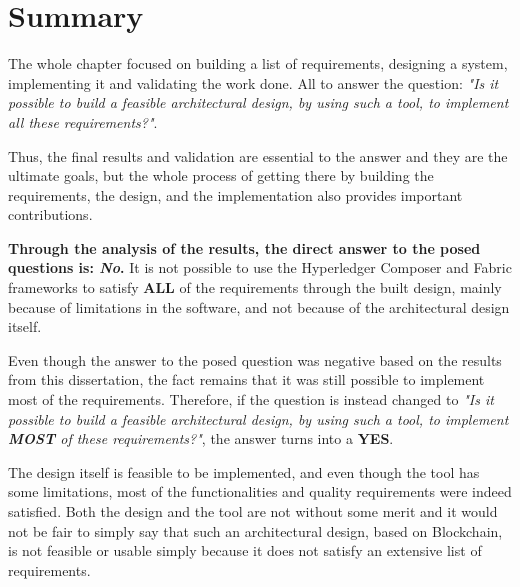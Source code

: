 \section{Summary}

The whole chapter focused on building a list of requirements, designing a system, implementing it and validating the work done. All to answer the question: \textit{"Is it possible to build a feasible architectural design, by using such a tool, to implement all these requirements?"}.

Thus, the final results and validation are essential to the answer and they are the ultimate goals, but the whole process of getting there by building the requirements, the design, and the implementation also provides important contributions.


\textbf{Through the analysis of the results, the direct answer to the posed questions is: \textit{No}.} It is not possible to use the Hyperledger Composer and Fabric frameworks to satisfy \textbf{ALL} of the requirements through the built design, mainly because of limitations in the software, and not because of the architectural design itself.

Even though the answer to the posed question was negative based on the results from this dissertation, the fact remains that it was still possible to implement most of the requirements. Therefore, if the question is instead changed to \textit{"Is it possible to build a feasible architectural design, by using such a tool, to implement \textbf{MOST} of these requirements?"}, the answer turns into a \textbf{YES}. 

The design itself is feasible to be implemented, and even though the tool has some limitations, most of the functionalities and quality requirements were indeed satisfied. Both the design and the tool are not without some merit and it would not be fair to simply say that such an architectural design, based on Blockchain, is not feasible or usable simply because it does not satisfy an extensive list of requirements.



